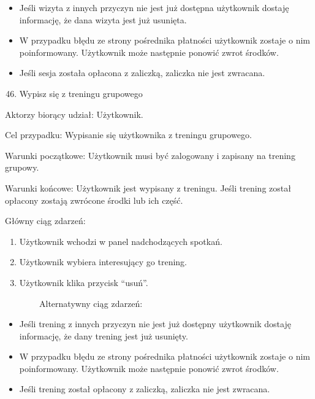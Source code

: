 \begin{itemize}
\tightlist
\item
  {Jeśli wizyta z innych przyczyn nie jest już dostępna użytkownik
  dostaję informację, że dana wizyta jest już usunięta.}
\item
  {W przypadku błędu ze strony pośrednika płatności użytkownik zostaje o
  nim poinformowany. Użytkownik może następnie ponowić zwrot środków.}
\item
  {Jeśli sesja została opłacona z zaliczką, zaliczka nie jest zwracana.}
\end{itemize}

{}

\begin{enumerate}
\setcounter{enumi}{45}
\tightlist
\item
  {Wypisz się z treningu grupowego}
\end{enumerate}

{Aktorzy biorący udział: Użytkownik.}

{Cel przypadku: Wypisanie się użytkownika z treningu grupowego.}

{Warunki początkowe: Użytkownik musi być zalogowany i zapisany na
trening grupowy. }

{Warunki końcowe: Użytkownik jest wypisany z treningu. Jeśli trening
został opłacony zostają zwrócone środki lub ich część.}

{Główny ciąg zdarzeń: }

\begin{enumerate}
\tightlist
\item
  {Użytkownik wchodzi w panel nadchodzących spotkań.}
\item
  {Użytkownik wybiera interesujący go trening.}
\item
  {Użytkownik klika przycisk ``usuń''.}
\end{enumerate}

{~~~~~~~~Alternatywny ciąg zdarzeń:}

\begin{itemize}
\tightlist
\item
  {Jeśli trening z innych przyczyn nie jest już dostępny użytkownik
  dostaję informację, że dany trening jest już usunięty.}
\item
  {W przypadku błędu ze strony pośrednika płatności użytkownik zostaje o
  nim poinformowany. Użytkownik może następnie ponowić zwrot środków.}
\item
  {Jeśli trening został opłacony z zaliczką, zaliczka nie jest
  zwracana.}
\end{itemize}

